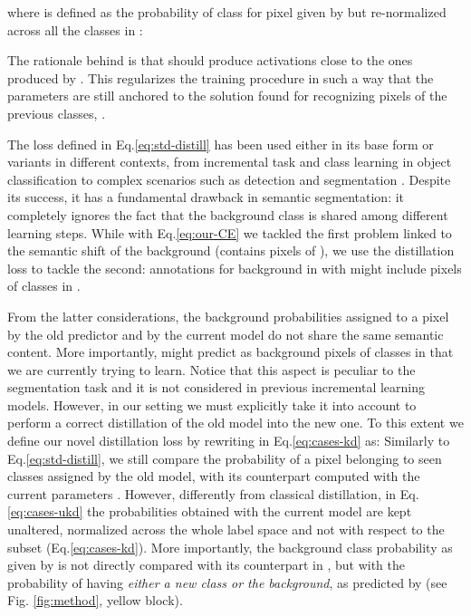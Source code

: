 where  is defined as the probability of class  for pixel  given by  but re-normalized across all the classes in  \ie:



The rationale behind  is that  should produce activations close to the ones produced by . This regularizes the training procedure in such a way that the parameters  are still anchored to the solution found for recognizing pixels of the previous classes, \ie . 

The loss defined in Eq.\eqref{eq:std-distill} has been used either in its base form or variants in different contexts, from incremental task \cite{li2017learning} and class learning \cite{rebuffi2017icarl,castro2018end} in object classification to complex scenarios such as detection \cite{shmelkov2017incremental} and segmentation \cite{michieli2019incremental}. Despite its success, it has a fundamental drawback in semantic segmentation: it completely ignores the fact that the background class is shared among different learning steps. While with Eq.\eqref{eq:our-CE} we tackled the first problem linked to the semantic shift of the background (\ie  contains pixels of ), we use the distillation loss to tackle the second: {annotations for background in  with  might include pixels of classes in .}


{From the latter considerations, the background probabilities assigned to a pixel by the old predictor  and by the current model  do not share the same semantic content.} More importantly,  might predict as background pixels of classes in  that we are currently trying to learn. Notice that this aspect is peculiar to the segmentation task and it is not considered in previous incremental learning models. However, in our setting we must explicitly take it into account to perform a correct distillation of the old model into the new one. To this extent we define our novel distillation loss by rewriting  in Eq.\eqref{eq:cases-kd} as: 
Similarly to Eq.\eqref{eq:std-distill}, we still compare the probability of a pixel belonging to seen classes assigned by the old model, with its counterpart computed with the current parameters . However, differently from classical distillation, in Eq.\eqref{eq:cases-ukd} the probabilities obtained with the current model are kept unaltered, \ie normalized across the whole label space  and not with respect to the subset  (Eq.\eqref{eq:cases-kd}). More importantly, the background class probability as given by  is not directly compared with its counterpart in , but with the probability of having \textit{either a new class or the background}, as predicted by  ({see Fig. \ref{fig:method}, yellow block}).  

